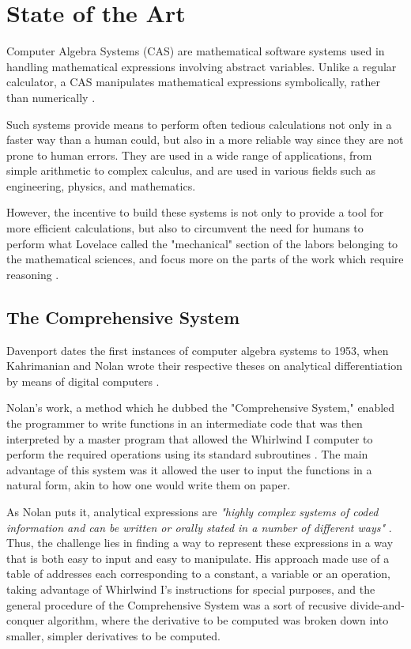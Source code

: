 \chapter{State of the Art}\label{chap:state-of-the-art}

Computer Algebra Systems (CAS) are mathematical software systems used in handling mathematical expressions involving abstract variables. Unlike a regular calculator, a CAS manipulates mathematical expressions symbolically, rather than numerically \parencite{bou2009computer}.

Such systems provide means to perform often tedious calculations not only in a faster way than a human could, but also in a more reliable way since they are not prone to human errors. They are used in a wide range of applications, from simple arithmetic to complex calculus, and are used in various fields such as engineering, physics, and mathematics.

However, the incentive to build these systems is not only to provide a tool for more efficient calculations, but also to circumvent the need for humans to perform what Lovelace called the "mechanical" section of the labors belonging to the mathematical sciences, and focus more on the parts of the work which require reasoning \cite{lovelace1842sketch}.

\section{The Comprehensive System}\label{sec:the-comprehensive-system}

Davenport dates the first instances of computer algebra systems to 1953, when Kahrimanian and Nolan wrote their respective theses on analytical differentiation by means of digital computers \parencite{davenport1994computer}.

Nolan's work, a method which he dubbed the "Comprehensive System," enabled the programmer to write functions in an intermediate code that was then interpreted by a master program that allowed the Whirlwind I computer to perform the required operations using its standard subroutines \parencite{nolan1953analytical}. The main advantage of this system was it allowed the user to input the functions in a natural form, akin to how one would write them on paper.

As Nolan puts it, analytical expressions are \textit{"highly complex systems of coded information and can be written or orally stated in a number of different ways"} \parencite{nolan1953analytical}. Thus, the challenge lies in finding a way to represent these expressions in a way that is both easy to input and easy to manipulate. His approach made use of a table of addresses each corresponding to a constant, a variable or an operation, taking advantage of Whirlwind I's instructions for special purposes, and the general procedure of the Comprehensive System was a sort of recusive divide-and-conquer algorithm, where the derivative to be computed was broken down into smaller, simpler derivatives to be computed.

